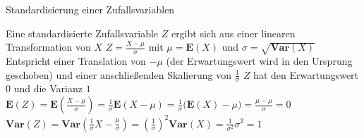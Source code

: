 \documentclass[mathserif]{beamer}
\begin{document}
\begin{frame}{Standardisierung einer Zufallsvariablen}
    \begin{outline}
        \1 Eine standardisierte Zufallsvariable $Z$ ergibt sich aus einer linearen Transformation von $X$
        \1 $Z=\frac{X-\mu}{\sigma}$ mit $\mu=\mathbf{E}(X)$ und $\sigma=\sqrt{\mathbf{Var}(X)}$
        \1 Entspricht einer Translation von $-\mu$ (der Erwartungswert wird in den Ursprung geschoben) und einer anschließenden Skalierung von $\frac{1}{\sigma}$
        \1 $Z$ hat den Erwartungswert $0$ und die Varianz $1$
        \1 $\mathbf{E}(Z)=\mathbf{E}\left(\frac{X-\mu}{\sigma}\right)=\frac{1}{\sigma}\mathbf{E}(X-\mu)=\frac{1}{\sigma}\Big(\mathbf{E}(X)-\mu\Big)=\frac{\mu-\mu}{\sigma}=0$
        \1 $\mathbf{Var}(Z)=\mathbf{Var}\left(\frac{1}{\sigma}X-\frac{\mu}{\sigma}\right)=\left(\frac{1}{\sigma}\right)^2\mathbf{Var}(X)=\frac{1}{\sigma^2}\sigma^2=1$
    \end{outline}
\end{frame}
\end{document}
